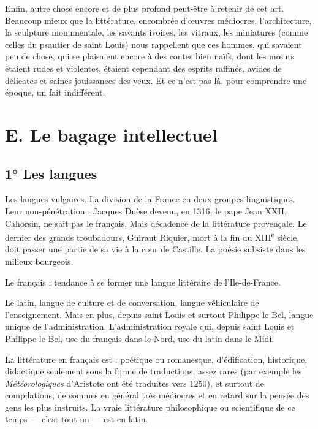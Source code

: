 \documentclass[french,twoside]{book} %
\begin{document}
Enfin, autre chose encore et de plus profond peut-être à retenir de cet art. Beaucoup mieux que la littérature, encombrée d’œuvres médiocres, l’architecture, la sculpture monumentale, les savants ivoires, les vitraux, les miniatures (comme celles du psautier de saint Louis) nous rappellent que ces hommes, qui savaient peu de chose, qui se plaisaient encore à des contes bien naïfs, dont les mœurs étaient rudes et violentes, étaient cependant des esprits raffinés, avides de délicates et saines jouissances des yeux. Et ce n’est pas là, pour comprendre une époque, un fait indifférent.
\section[E. Le bagage intellectuel]{E. Le bagage intellectuel}
\label{c11e}
\subsection[1° Les langues]{1° Les langues}

\begin{listalpha}[itemsep=\baselineskip,]
\item Les langues vulgaires. La division de la France en deux groupes linguistiques. Leur non-pénétration : Jacques Duèse devenu, en 1316, le pape Jean XXII, Cahorsin, ne sait pas le français. Mais décadence de la littérature provençale. Le dernier des grands troubadours, Guiraut Riquier, mort à la fin du XIII\textsuperscript{e} siècle, doit passer une partie de sa vie à la cour de Castille. La poésie subsiste dans les milieux bourgeois.\par
Le français : tendance à se former une langue littéraire de l’Ile-de-France.

\item Le latin, langue de culture et de conversation, langue véhiculaire de l’enseignement. Mais en plus, depuis saint Louis et surtout Philippe le Bel, langue unique de l’administration. L’administration royale qui, depuis saint Louis et Philippe le Bel, use du français dans le Nord, use du latin dans le Midi.

\end{listalpha}\noindent La littérature en français est : poétique ou romanesque, d’édification, historique, didactique seulement sous la forme de traductions, assez rares (par exemple les {\itshape Météorologiques} d’Aristote ont été traduites vers 1250), et surtout de compilations, de sommes en général très médiocres et en retard sur la pensée des gens les plus instruits. La vraie littérature philosophique ou scientifique de ce temps — c’est tout un — est en latin.
\end{document}
